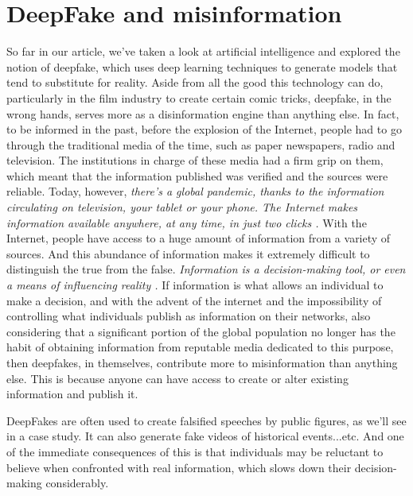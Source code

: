 \section{ DeepFake and misinformation}
So far in our article, we've taken a look at artificial intelligence and explored the notion of deepfake, which uses deep learning techniques to generate models that tend to substitute for reality. Aside from all the good this technology can do, particularly in the film industry to create certain comic tricks, deepfake, in the wrong hands, serves more as a disinformation engine than anything else. 
In fact, to be informed in the past, before the explosion of the Internet, people had to go through the traditional media of the time, such as paper newspapers, radio and television. The institutions in charge of these media had a firm grip on them, which meant that the information published was verified and the sources were reliable. 
Today, however, \emph{there's a global pandemic, thanks to the information circulating on television, your tablet or your phone. The Internet makes information available anywhere, at any time, in just two clicks \cite{laetitiaCommentInformaitonAvant2021}.} With the Internet, people have access to a huge amount of information from a variety of sources. And this abundance of information makes it extremely difficult to distinguish the true from the false. 
\emph{Information is a decision-making tool, or even a means of influencing reality \cite{boydensOceanDonneesCanal2012a}.} If information is what allows an individual to make a decision, and with the advent of the internet and the impossibility of controlling what individuals publish as information on their networks, also considering that a significant portion of the global population no longer has the habit of obtaining information from reputable media dedicated to this purpose, then deepfakes, in themselves, contribute more to misinformation than anything else. This is because anyone can have access to create or alter existing information and publish it.

DeepFakes are often used to create falsified speeches by public figures, as we'll see in a case study. It can also generate fake videos of historical events...etc. And one of the immediate consequences of this is that individuals may be reluctant to believe when confronted with real information, which slows down their decision-making considerably.
